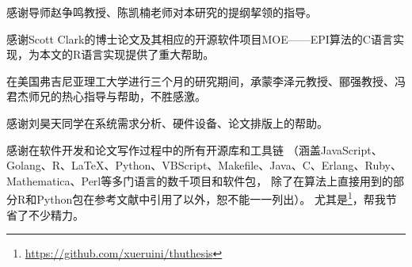 \documentclass[degree=bachelor,tocarialchapter]{../thuthesis/thuthesis}
\let\oldlabel\label%
\let\oldref\ref%
\let\oldcref\cref%
\let\oldCref\Cref%
\newcommand{\addlabelprefix}[1]{%
  \renewcommand{\label}[1]{\oldlabel{#1-##1}}%
  \renewcommand{\ref}[1]{\oldref{#1-##1}}%
}
\newcommand{\addlabelprefixc}[1]{%
  \renewcommand{\label}[1]{\oldlabel{#1-##1}}%
  \renewcommand{\cref}[1]{\oldcref{#1-##1}}%
  \renewcommand{\Cref}[1]{\oldCref{#1-##1}}%
}
\newcommand{\removelabelprefix}{%
  \renewcommand{\label}{\oldlabel}%
  \renewcommand{\ref}{\oldref}%
  \renewcommand{\cref}{\oldcref}%
  \renewcommand{\Cref}{\oldCref}%
}
\begin{document}
\mainmatter










\backmatter

\listoffigures
\listoftables
\listofequations




\begin{acknowledgement}
  感谢导师赵争鸣教授、陈凯楠老师对本研究的提纲挈领的指导。

  感谢Scott Clark的博士论文\cite{clark2012}及其相应的开源软件项目MOE——EPI算法的C语言实现，为本文的R语言实现提供了重大帮助。

  在美国弗吉尼亚理工大学进行三个月的研究期间，承蒙李泽元教授、郦强教授、冯君杰师兄的热心指导与帮助，不胜感激。

  感谢刘昊天同学在系统需求分析、硬件设备、论文排版上的帮助。

  感谢在软件开发和论文写作过程中的所有开源库和工具链
  （涵盖JavaScript、Golang、R、\LaTeX、Python、VBScript、Makefile、Java、C、Erlang、Ruby、Mathematica、Perl等多门语言的数千项目和软件包，
  除了在算法上直接用到的部分R和Python包在参考文献中引用了以外，恕不能一一列出）。
  尤其是\thuthesis\footnote{\href{https://github.com/xueruini/thuthesis}{https://github.com/xueruini/thuthesis}}，帮我节省了不少精力。
\end{acknowledgement}

\begin{appendix}
\ifdefined\stripped\relax\else
{}
\addtocontents{lof}{\protect\iffalse}
\addtocontents{lot}{\protect\iffalse}
\addtocontents{loe}{\protect\iffalse}
\addlabelprefixc{trans}

\removelabelprefix
\addlabelprefix{raw}

\removelabelprefix
\addtocontents{toc}{\protect\setcounter{tocdepth}{5}}
\addtocontents{lof}{\protect\fi}
\addtocontents{lot}{\protect\fi}
\addtocontents{loe}{\protect\fi}
\fi

\end{appendix}
\end{document}

